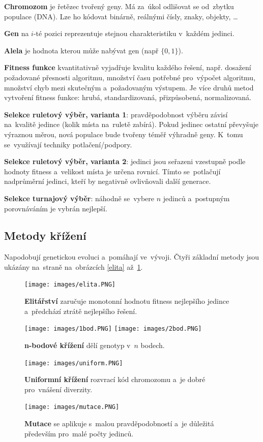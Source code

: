 \textbf{Chromozom} je řetězec tvořený geny. Má za~úkol odlišovat se od~zbytku populace (DNA). Lze ho kódovat binárně, reálnými čísly, znaky, objekty, \dots

\textbf{Gen} na $i$-té pozici reprezentuje stejnou charakteristiku v~každém jedinci.

\textbf{Alela} je hodnota kterou může nabývat gen (např $\{0, 1\}$).

\textbf{Fitness funkce} kvantitativně vyjadřuje kvalitu každého řešení, např. dosažení požadované přesnosti algoritmu, množství času potřebné pro~výpočet algoritmu, množství chyb mezi skutečným a~požadovaným výstupem. Je více druhů metod vytvoření fitness funkce: hrubá, standardizovaná, přizpůsobená, normalizovaná.

\textbf{Selekce ruletový výběr, varianta 1}: pravděpodobnost výběru závisí na~kvalitě jedince (kolik místa na~ruletě zabírá). Pokud jedinec ostatní převyšuje výraznou měrou, nová populace bude tvořeny téměř výhradně geny. K~tomu se~využívají techniky potlačení/podpory.

\textbf{Selekce ruletový výběr, varianta 2}: jedinci jsou seřazeni vzestupně podle hodnoty fitness a~velikost místa je určena rovnicí. Tímto se~potlačují nadprůměrní jedinci, kteří by negativně ovlivňovali další generace.

\textbf{Selekce turnajový výběr}: náhodně se~vybere $n$ jedinců a~postupným porovnáváním je vybrán nejlepší.

\subsection{Metody křížení}

Napodobují genetickou evoluci a~pomáhají ve~vývoji. Čtyři základní metody jsou ukázány na~straně \pageref{elita} na~obrázcích \ref{elita} až~\ref{mutace}.

\begin{figure}[ht]
	\centering
	\texttt{[image: images/elita.PNG]}
	\caption{\textbf{Elitářství} zaručuje monotonní hodnotu fitness nejlepšího jedince a~předchází ztrátě nejlepšího řešení.}
	\label{elita}

	\texttt{[image: images/1bod.PNG]}
	\texttt{[image: images/2bod.PNG]}
	\caption{\textbf{n-bodové křížení} dělí genotyp v~$n$ bodech.}
	\label{1bod2bod}

	\texttt{[image: images/uniform.PNG]}
	\caption{\textbf{Uniformní křížení} rozvrací kód chromozomu a~je dobré pro~vnášení diverzity.}
	\label{uniform}

	\texttt{[image: images/mutace.PNG]}
	\caption{\textbf{Mutace} se aplikuje s~malou pravděpodobností a~je důležitá především pro~malé počty jedinců.}
	\label{mutace}
\end{figure}

